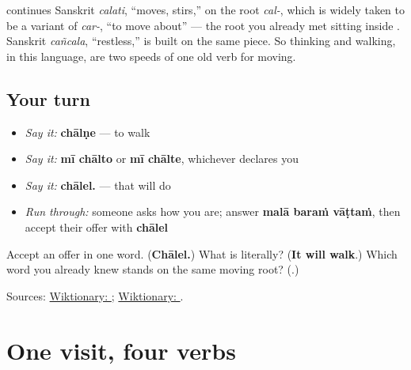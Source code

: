 \begin{cousinweb}
\textbf{} continues Sanskrit \textbf{} \emph{calati}, \textquotedblleft{}moves, stirs,\textquotedblright{} on the root \textbf{} \emph{cal-}, which is widely taken to be a variant of \textbf{} \emph{car-}, \textquotedblleft{}to move about\textquotedblright{} — the root you already met sitting inside \textbf{}. Sanskrit \textbf{} \emph{cañcala}, \textquotedblleft{}restless,\textquotedblright{} is built on the same piece. So thinking and walking, in this language, are two speeds of one old verb for moving.
\end{cousinweb}

\subsection*{Your turn}
\begin{itemize}
\raggedright
  \item \emph{Say it:} \textbf{chālṇe} — to walk
  \item \emph{Say it:} \textbf{mī chālto} or \textbf{mī chālte}, whichever declares you
  \item \emph{Say it:} \textbf{chālel.} — that will do
  \item \emph{Run through:} someone asks how you are; answer \textbf{malā baraṁ vāṭtaṁ}, then accept their offer with \textbf{chālel}
\end{itemize}

\begin{tcolorbox}[breakable,colback=teal!4,colframe=teal!35!black,title={Before you move on}]
Accept an offer in one word. (\textbf{Chālel.}) What is \textbf{} literally? (\textbf{It will walk}.) Which word you already knew stands on the same moving root? (\textbf{}.)

Sources: \href{https://en.wiktionary.org/wiki/\%E0\%A4\%9A\%E0\%A4\%BE\%E0\%A4\%B2\%E0\%A4\%A3\%E0\%A5\%87}{Wiktionary: }; \href{https://en.wiktionary.org/wiki/\%E0\%A4\%9A\%E0\%A4\%B2\%E0\%A4\%A4\%E0\%A4\%BF}{Wiktionary: }.
\end{tcolorbox}
\section[basā / vāṭtaṁ / jhop / chālel]{One visit, four verbs}

\label{lesson:MR-R23-wellbeing-verbs}



